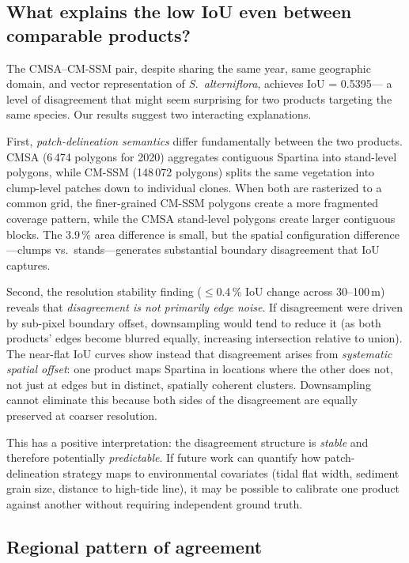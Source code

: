 \documentclass[11pt]{article}
\begin{document}
\subsection{What explains the low IoU even between comparable products?}

The CMSA--CM-SSM pair, despite sharing the same year, same geographic domain,
and vector representation of \textit{S.~alterniflora}, achieves IoU = 0.5395---
a level of disagreement that might seem surprising for two products targeting
the same species. Our results suggest two interacting explanations.

First, \textit{patch-delineation semantics} differ fundamentally between the
two products. CMSA (6\,474 polygons for 2020) aggregates contiguous Spartina
into stand-level polygons, while CM-SSM (148\,072 polygons) splits the same
vegetation into clump-level patches down to individual clones. When both are
rasterized to a common grid, the finer-grained CM-SSM polygons create a more
fragmented coverage pattern, while the CMSA stand-level polygons create larger
contiguous blocks. The 3.9\,\% area difference is small, but the spatial
configuration difference---clumps vs.\ stands---generates substantial
boundary disagreement that IoU captures.

Second, the resolution stability finding ($\leq$0.4\,\% IoU change across
30--100\,m) reveals that \emph{disagreement is not primarily edge noise}. If
disagreement were driven by sub-pixel boundary offset, downsampling would tend
to reduce it (as both products' edges become blurred equally, increasing
intersection relative to union). The near-flat IoU curves show instead that
disagreement arises from \emph{systematic spatial offset}: one product maps
Spartina in locations where the other does not, not just at edges but in
distinct, spatially coherent clusters. Downsampling cannot eliminate this
because both sides of the disagreement are equally preserved at coarser
resolution.

This has a positive interpretation: the disagreement structure is \emph{stable}
and therefore potentially \emph{predictable}. If future work can quantify how
patch-delineation strategy maps to environmental covariates (tidal flat width,
sediment grain size, distance to high-tide line), it may be possible to
calibrate one product against another without requiring independent ground
truth.

\subsection{Regional pattern of agreement}
\label{sec:disc-regional}
\end{document}
